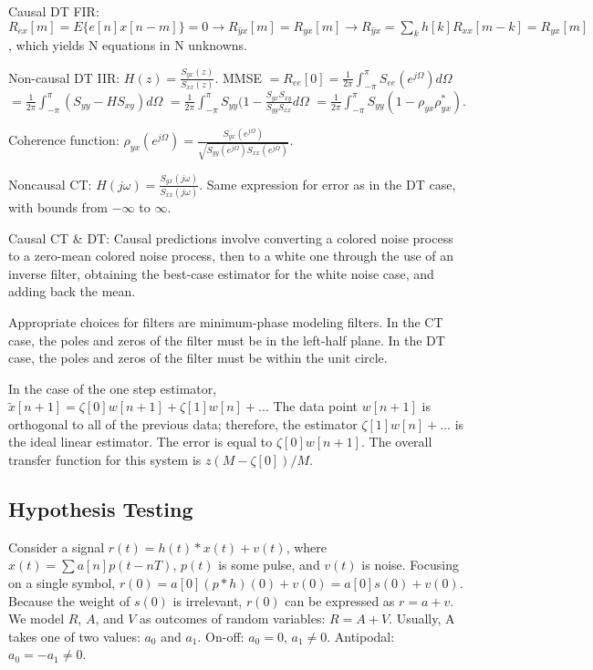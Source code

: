 \documentclass[8pt]{extarticle}
\begin{document}
\begin{multicols*}{3}
\begin{center}
Causal DT FIR: \( R_{ex}[m] = E\{e[n]x[n-m]\} = 0 \rightarrow R_{\hat{y}x}[m] = R_{yx}[m] \rightarrow R_{\hat{y}{x}} = \sum_{k} h[k]R_{xx}[m-k] = R_{yx}[m] \), which yields N equations in N unknowns.

Non-causal DT IIR: \( H(z) = \frac{S_{yx}(z)}{S_{xx}(z)} \).
MMSE \( = R_{ee}[0] = \frac{1}{2\pi} \int_{-\pi}^{\pi} S_{ee}(e^{j\Omega}) d\Omega \) \( = \frac{1}{2\pi} \int_{-\pi}^{\pi} (S_{yy}-H S_{xy}) d\Omega \) \( = \frac{1}{2\pi} \int_{-\pi}^{\pi} S_{yy} (1-\frac{S_{yx}S_{xy}}{S_{yy}S_{xx}} d\Omega \) \( = \frac{1}{2\pi} \int_{-\pi}^{\pi} S_{yy}(1-\rho_{yx} \rho^{*}_{yx}) \).

Coherence function: \( \rho_{yx}(e^{j\Omega}) = \frac{S_{yx}(e^{j\Omega})}{\sqrt{S_{yy}(e^{j\Omega}) S_{xx}(e^{j\Omega})}} \).

Noncausal CT: \( H(j\omega) = \frac{S_{yx}(j\omega)}{S_{xx}(j\omega)} \). Same expression for error as in the DT case, with bounds from \( -\infty \) to \( \infty \).

Causal CT \& DT: 
Causal predictions involve converting a colored noise process to a zero-mean colored noise process, then to a white one through the use of an inverse filter, obtaining the best-case estimator for the white noise case, and adding back the mean.

Appropriate choices for filters are minimum-phase modeling filters. In the CT case, the poles and zeros of the filter must be in the left-half plane. In the DT case, the poles and zeros of the filter must be within the unit circle.

In the case of the one step estimator,
\( \tilde{x}[n+1] = \zeta[0]w[n+1] + \zeta[1]w[n] + \ldots \)
The data point \( w[n+1] \) is orthogonal to all of the previous data; therefore, the estimator \( \zeta[1]w[n] + \ldots \) is the ideal linear estimator. The error is equal to \( \zeta[0]w[n+1] \). The overall transfer function for this system is \( z(M-\zeta[0])/M \).

\subsection{Hypothesis Testing}
Consider a signal \( r(t) = h(t) * x(t) + v(t) \), where \( x(t) = \sum a[n]p(t-nT) \), \( p(t) \) is some pulse, and \( v(t) \) is noise. Focusing on a single symbol, \( r(0) = a[0] (p*h)(0) + v(0) = a[0] s(0) + v(0) \). Because the weight of \( s(0) \) is irrelevant, \( r(0) \) can be expressed as \( r = a + v \). We model \( R \), \( A \), and \( V \) as outcomes of random variables: \( R = A + V \). Usually, A takes one of two values: \( a_0 \) and \( a_1 \). On-off: \( a_0 = 0 \), \( a_1 \neq 0 \). Antipodal: \( a_0 = -a_1 \neq 0 \).


\end{center}
\end{multicols*}
\end{document}
